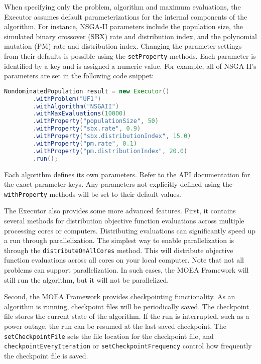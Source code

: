 When specifying only the problem, algorithm and maximum evaluations, the Executor assumes default parameterizations for the internal components of the algorithm.  For instance, NSGA-II parameters include the population size, the simulated binary crossover (SBX) rate and distribution index, and the polynomial mutation (PM) rate and distribution index.  Changing the parameter settings from their defaults is possible using the \texttt{setProperty} methods.  Each parameter is identified by a key and is assigned a numeric value.  For example, all of NSGA-II's parameters are set in the following code snippet:

\begin{lstlisting}[language=Java]
NondominatedPopulation result = new Executor()
		.withProblem("UF1")
		.withAlgorithm("NSGAII")
		.withMaxEvaluations(10000)
		.withProperty("populationSize", 50)
		.withProperty("sbx.rate", 0.9)
		.withProperty("sbx.distributionIndex", 15.0)
		.withProperty("pm.rate", 0.1)
		.withProperty("pm.distributionIndex", 20.0)
		.run();
\end{lstlisting}

Each algorithm defines its own parameters.  Refer to the API documentation for the exact parameter keys.  Any parameters not explicitly defined using the \texttt{withProperty} methods will be set to their default values.

The Executor also provides some more advanced features.  First, it contains several methods for distribution objective function evaluations across multiple processing cores or computers.  Distributing evaluations can significantly speed up a run through parallelization.  The simplest way to enable parallelization is through the \texttt{distributeOnAllCores} method.  This will distribute objective function evaluations across all cores on your local computer.  Note that not all problems can support parallelization.  In such cases, the MOEA Framework will still run the algorithm, but it will not be parallelized.

Second, the MOEA Framework provides checkpointing functionality.  As an algorithm is running, checkpoint files will be periodically saved.  The checkpoint file stores the current state of the algorithm.  If the run is interrupted, such as a power outage, the run can be resumed at the last saved checkpoint.  The \texttt{setCheckpointFile} sets the file location for the checkpoint file, and \texttt{checkpointEveryIteration} or \texttt{setCheckpointFrequency} control how frequently the checkpoint file is saved.

